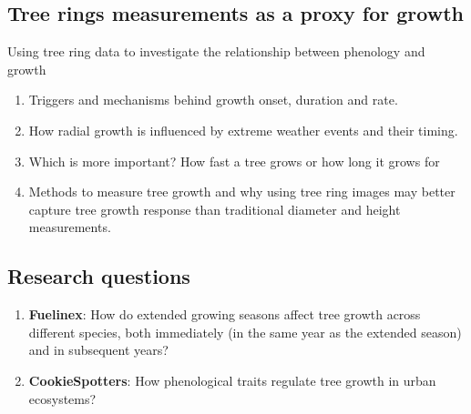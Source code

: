 \documentclass{article}
\begin{document}
\subsection{Tree rings measurements as a proxy for growth}
Using tree ring data to investigate the relationship between phenology and growth

\begin{enumerate}
	\item Triggers and mechanisms behind growth onset, duration and rate.
	\item How radial growth is influenced by extreme weather events and their timing. 
	\item Which is more important? How fast a tree grows or how long it grows for
	\item Methods to measure tree growth and why using tree ring images may better capture tree growth response than traditional diameter and height measurements.
\end{enumerate}



\subsection {Research questions}
\begin {enumerate}
	\item \textbf{Fuelinex}: How do extended growing seasons affect tree growth across different species, both immediately (in the same year as the extended season) and in subsequent years?
	\item \textbf {CookieSpotters}: How phenological traits regulate tree growth in urban ecosystems?
\end {enumerate}
\end{document}
